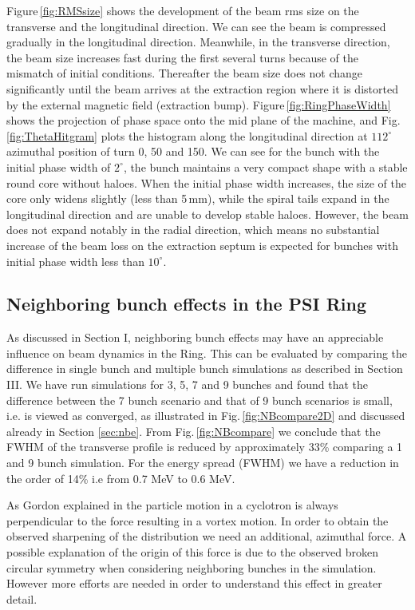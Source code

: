 \documentclass[aps,prstab,onecolumn,superscriptaddress,showpacs]{revtex4}
\begin{document}
Figure\,\ref{fig:RMSsize} shows the development of the beam rms size on the transverse and the longitudinal direction. We can see the beam is compressed
gradually in the longitudinal direction. Meanwhile, in the transverse direction, the beam size increases fast during the first several turns 
because of the mismatch of initial conditions. Thereafter the beam size  does not change significantly until the beam arrives at the extraction region 
where it is distorted by the external magnetic field (extraction bump).
Figure\,\ref{fig:RingPhaseWidth} shows the projection of phase space onto the mid plane of the machine, and 
Fig.\,\ref{fig:ThetaHitgram} plots the histogram along the longitudinal direction at $112^\circ$ azimuthal position of turn 0, 50 and 150.
We can see for the bunch with the initial phase width of $2^\circ$, the bunch maintains a very compact shape with a stable round core without haloes. 
When the initial phase width increases, the size of the core only widens slightly (less than 5\,mm), while the spiral tails expand in the longitudinal direction and 
are unable to develop stable haloes. However, the beam does not expand notably in the radial direction, which means no substantial increase of the beam loss 
on the extraction septum is expected for bunches with initial phase width less than $10^\circ$.

\subsection {Neighboring bunch effects in the PSI Ring}

As discussed in Section I, neighboring bunch effects may have an appreciable influence on beam dynamics in the Ring. This can be evaluated by comparing the difference in single bunch and multiple bunch simulations as 
described in Section III. We have run simulations for  3, 5, 7 and 9 bunches and found that 
the difference between the 7 bunch scenario and that of 9 bunch scenarios is small, i.e. is viewed as converged,  as illustrated in Fig.\,\ref{fig:NBcompare2D} and discussed already in Section \ref{sec:nbe}.
From Fig.\,\ref{fig:NBcompare} we conclude that the FWHM of the  transverse profile is reduced by approximately 33\% comparing a 1 and 9 bunch simulation. For the energy spread (FWHM) we have a reduction in the order
of 14\% i.e from 0.7 MeV to 0.6 MeV.


As Gordon explained in \cite{Gordon:1} the particle motion in a cyclotron is always perpendicular to the force
resulting in a vortex motion. In order to obtain the observed sharpening of the distribution we
need an additional, azimuthal force. A possible explanation of the origin of this force is due to the observed broken circular symmetry when considering neighboring bunches in the simulation. However more  efforts are needed in order to understand this effect in greater detail.
\end{document}
